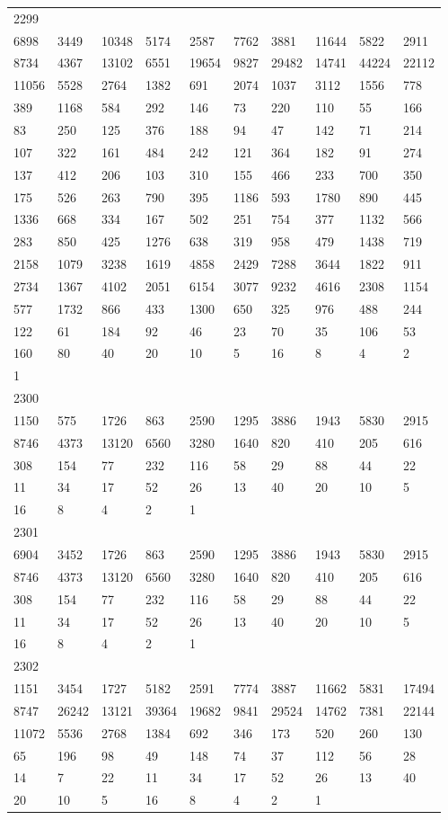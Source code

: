\begin{longtable}{*{10}{l}}
2299&&&&&&&&&\\
6898& 3449& 10348& 5174& 2587& 7762& 3881& 11644& 5822& 2911\\
8734& 4367& 13102& 6551& 19654& 9827& 29482& 14741& 44224& 22112\\
11056& 5528& 2764& 1382& 691& 2074& 1037& 3112& 1556& 778\\
389& 1168& 584& 292& 146& 73& 220& 110& 55& 166\\
83& 250& 125& 376& 188& 94& 47& 142& 71& 214\\
107& 322& 161& 484& 242& 121& 364& 182& 91& 274\\
137& 412& 206& 103& 310& 155& 466& 233& 700& 350\\
175& 526& 263& 790& 395& 1186& 593& 1780& 890& 445\\
1336& 668& 334& 167& 502& 251& 754& 377& 1132& 566\\
283& 850& 425& 1276& 638& 319& 958& 479& 1438& 719\\
2158& 1079& 3238& 1619& 4858& 2429& 7288& 3644& 1822& 911\\
2734& 1367& 4102& 2051& 6154& 3077& 9232& 4616& 2308& 1154\\
577& 1732& 866& 433& 1300& 650& 325& 976& 488& 244\\
122& 61& 184& 92& 46& 23& 70& 35& 106& 53\\
160& 80& 40& 20& 10& 5& 16& 8& 4& 2\\
1& \\

2300&&&&&&&&&\\
1150& 575& 1726& 863& 2590& 1295& 3886& 1943& 5830& 2915\\
8746& 4373& 13120& 6560& 3280& 1640& 820& 410& 205& 616\\
308& 154& 77& 232& 116& 58& 29& 88& 44& 22\\
11& 34& 17& 52& 26& 13& 40& 20& 10& 5\\
16& 8& 4& 2& 1& \\

2301&&&&&&&&&\\
6904& 3452& 1726& 863& 2590& 1295& 3886& 1943& 5830& 2915\\
8746& 4373& 13120& 6560& 3280& 1640& 820& 410& 205& 616\\
308& 154& 77& 232& 116& 58& 29& 88& 44& 22\\
11& 34& 17& 52& 26& 13& 40& 20& 10& 5\\
16& 8& 4& 2& 1& \\

2302&&&&&&&&&\\
1151& 3454& 1727& 5182& 2591& 7774& 3887& 11662& 5831& 17494\\
8747& 26242& 13121& 39364& 19682& 9841& 29524& 14762& 7381& 22144\\
11072& 5536& 2768& 1384& 692& 346& 173& 520& 260& 130\\
65& 196& 98& 49& 148& 74& 37& 112& 56& 28\\
14& 7& 22& 11& 34& 17& 52& 26& 13& 40\\
20& 10& 5& 16& 8& 4& 2& 1& \\


\end{longtable}
